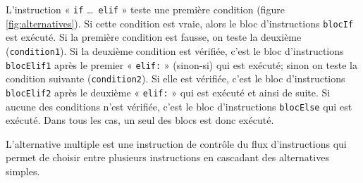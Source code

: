 L'instruction « {\tt if} \ldots\ {\tt elif} » teste une première condition (figure \ref{fig:alternatives}). 
Si cette condition est vraie, alors le bloc d'instructions {\tt blocIf} 
est exécuté. Si la première condition est fausse, on teste la deuxième ({\tt condition1}).
Si la deuxième condition est vérifiée, c'est le bloc d'instructions {\tt blocElif1} après le premier « {\tt elif:} » 
(sinon-si) qui est exécuté; sinon on teste la condition suivante ({\tt condition2}).
Si elle est vérifiée, c'est le bloc d'instructions {\tt blocElif2} après le deuxième « {\tt elif:} » 
qui est exécuté et ainsi de suite. Si aucune des conditions n'est vérifiée, c'est le bloc d'instructions
{\tt blocElse} qui est exécuté. Dans tous les cas, un seul des blocs est donc exécuté.

\begin{defin}
L'alternative multiple est une instruction de contrôle du flux d'instructions 
qui permet de choisir entre plusieurs instructions en cascadant des alternatives simples.
\end{defin}


